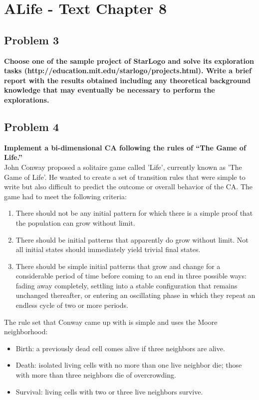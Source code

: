 
\chapter{ALife - Text Chapter 8}

\section{ Problem 3 }
\textbf{ Choose one of the sample project of StarLogo and solve its exploration tasks (http://education.mit.edu/starlogo/projects.html). Write a brief report with the results obtained including any theoretical background knowledge that may eventually be necessary to perform the explorations. } 

\section{ Problem 4 }
\textbf{ Implement a bi-dimensional CA following the rules of ``The Game of Life.'' }\\
\newline
John Conway proposed a solitaire game called 'Life', currently known as 'The Game of Life'. He wanted to create a set of transition rules that were simple to write but also difficult to predict the outcome or overall behavior of the CA. The game had to meet the following criteria:
\begin{enumerate}
\item There should not be any initial pattern for which there is a simple proof that the population can grow without limit.
\item There should be initial patterns that apparently do grow without limit. Not all initial states should immediately yield trivial final states.
\item There should be simple initial patterns that grow and change for a considerable period of time before coming to an end in three possible ways: fading away completely, settling into a stable configuration that remains unchanged thereafter, or entering an oscillating phase in which they repeat an endless cycle of two or more periods.
\end{enumerate}

The rule set that Conway came up with is simple and uses the Moore neighborhood:
\begin{itemize}
    \item Birth: a previously dead cell comes alive if three neighbors are alive.
    \item Death: isolated living cells with no more than one live neighbor die; those with more than three neighbors die of overcrowding.
    \item Survival: living cells with two or three live neighbors survive.
\end{itemize}


